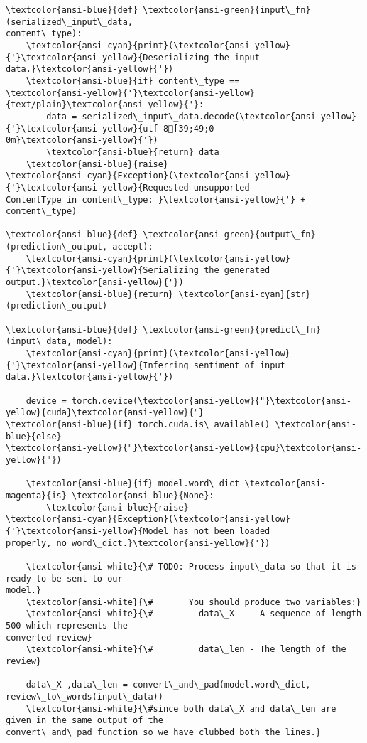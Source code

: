 \documentclass[11pt]{article}
\begin{document}
\begin{Verbatim}[commandchars=\\\{\}]
\textcolor{ansi-blue}{def} \textcolor{ansi-green}{input\_fn}(serialized\_input\_data,
content\_type):
    \textcolor{ansi-cyan}{print}(\textcolor{ansi-yellow}{'}\textcolor{ansi-yellow}{Deserializing the input
data.}\textcolor{ansi-yellow}{'})
    \textcolor{ansi-blue}{if} content\_type ==
\textcolor{ansi-yellow}{'}\textcolor{ansi-yellow}{text/plain}\textcolor{ansi-yellow}{'}:
        data = serialized\_input\_data.decode(\textcolor{ansi-yellow}{'}\textcolor{ansi-yellow}{utf-8[39;49;0
0m}\textcolor{ansi-yellow}{'})
        \textcolor{ansi-blue}{return} data
    \textcolor{ansi-blue}{raise}
\textcolor{ansi-cyan}{Exception}(\textcolor{ansi-yellow}{'}\textcolor{ansi-yellow}{Requested unsupported
ContentType in content\_type: }\textcolor{ansi-yellow}{'} + content\_type)

\textcolor{ansi-blue}{def} \textcolor{ansi-green}{output\_fn}(prediction\_output, accept):
    \textcolor{ansi-cyan}{print}(\textcolor{ansi-yellow}{'}\textcolor{ansi-yellow}{Serializing the generated
output.}\textcolor{ansi-yellow}{'})
    \textcolor{ansi-blue}{return} \textcolor{ansi-cyan}{str}(prediction\_output)

\textcolor{ansi-blue}{def} \textcolor{ansi-green}{predict\_fn}(input\_data, model):
    \textcolor{ansi-cyan}{print}(\textcolor{ansi-yellow}{'}\textcolor{ansi-yellow}{Inferring sentiment of input
data.}\textcolor{ansi-yellow}{'})

    device = torch.device(\textcolor{ansi-yellow}{"}\textcolor{ansi-yellow}{cuda}\textcolor{ansi-yellow}{"}
\textcolor{ansi-blue}{if} torch.cuda.is\_available() \textcolor{ansi-blue}{else}
\textcolor{ansi-yellow}{"}\textcolor{ansi-yellow}{cpu}\textcolor{ansi-yellow}{"})

    \textcolor{ansi-blue}{if} model.word\_dict \textcolor{ansi-magenta}{is} \textcolor{ansi-blue}{None}:
        \textcolor{ansi-blue}{raise}
\textcolor{ansi-cyan}{Exception}(\textcolor{ansi-yellow}{'}\textcolor{ansi-yellow}{Model has not been loaded
properly, no word\_dict.}\textcolor{ansi-yellow}{'})

    \textcolor{ansi-white}{\# TODO: Process input\_data so that it is ready to be sent to our
model.}
    \textcolor{ansi-white}{\#       You should produce two variables:}
    \textcolor{ansi-white}{\#         data\_X   - A sequence of length 500 which represents the
converted review}
    \textcolor{ansi-white}{\#         data\_len - The length of the review}

    data\_X ,data\_len = convert\_and\_pad(model.word\_dict,
review\_to\_words(input\_data))
    \textcolor{ansi-white}{\#since both data\_X and data\_len are given in the same output of the
convert\_and\_pad function so we have clubbed both the lines.}


\end{Verbatim}
\end{document}
